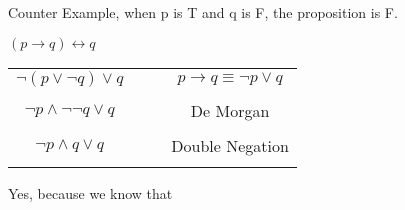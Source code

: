 \documentclass[11pt,largemargins]{homework}
\begin{document}
\begin{alphaparts}
      Counter Example, when p is T and q is F, the proposition is F.

    \questionpart
      $(p \rightarrow q) \leftrightarrow q$

        
      \begin{tabular}{cccc}
        \\ 
        $\neg (p \lor \neg q) \lor q$ &&& $p \rightarrow q \equiv \neg p \lor q$ \\
        &&& \\
        
        $\neg p \land \neg \neg q \lor q$ &&& De Morgan \\
        &&& \\

        $\neg p \land q \lor q$ &&& Double Negation \\
        
        \\      
      \end{tabular}

      
      
  \end{alphaparts}





\newpage
\setcounter{questionCounter}{7}
\question
  \begin{alphaparts}
    \questionpart
      Yes, because we know that 
    \questionpart
  \end{alphaparts}

  
\end{document}
